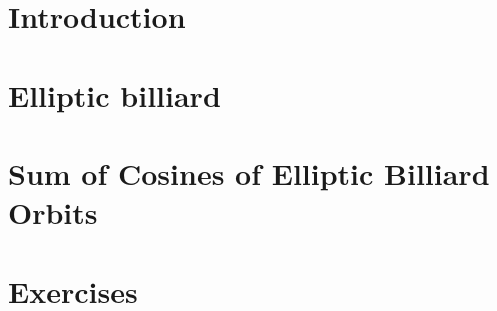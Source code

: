 \section{Introduction}
\label{sec:05-intro}


\section{Elliptic billiard}
\label{sec:05-elliptic_billiard}


\section{Sum of Cosines of Elliptic Billiard Orbits}
\label{sec:05-invariant_elliptic_billiard}


\section{Exercises}
\label{05-exercises}
